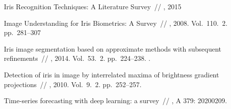 \documentclass[12pt, twoside]{article}
\begin{document}
\begin{thebibliography}{99}


   Iris Recognition Techniques: A Literature Survey~//
    , 2015

   Image Understanding for Iris Biometrics: A Survey~//
    , 2008. Vol.~110. \No\,2. pp.~281--307
	
   Iris image segmentation based on approximate methods
with subsequent refinements~//
    , 2014. Vol.~53. \No\,2. pp.~224--238.
	.
	
   Detection of iris in image by interrelated maxima of brightness gradient projections~//
    , 2010. Vol.~9. \No\,2. pp.~252--257.
    
    Time-series forecasting with deep learning: a survey~//
	, A 379: 20200209.
 
 	
\end{thebibliography}

\end{document}
